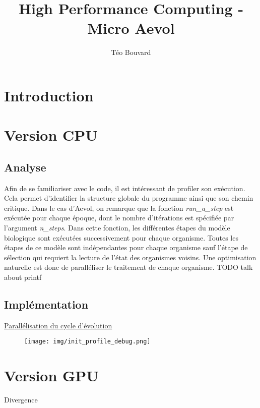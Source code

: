 \documentclass[a4paper, 10pt, twoside]{article}
\begin{document}
\title{High Performance Computing - Micro Aevol}
\author{T\'eo Bouvard}
\maketitle

\section{Introduction}
\section{Version CPU}
\subsection{Analyse}
Afin de se familiariser avec le code, il est intéressant de profiler son exécution. Cela permet d'identifier la structure globale du programme ainsi que son chemin critique. Dans le cas d'Aevol, on remarque que la fonction \textit{run\_a\_step} est exécutée pour chaque époque, dont le nombre d'itérations est spécifiée par l'argument \textit{n\_steps}.
Dans cette fonction, les différentes étapes du modèle biologique sont exécutées successivement pour chaque organisme. Toutes les étapes de ce modèle sont indépendantes pour chaque organisme sauf l'étape de sélection qui requiert la lecture de l'état des organismes voisins. Une optimisation naturelle est donc de paralléliser le traitement de chaque organisme\label{parallel/orga}.
TODO talk about printf
\subsection{Implémentation}
\hyperref[parallel/orga]{Parallélisation du cycle d'évolution}

\begin{figure}
	\texttt{[image: img/init\_profile\_debug.png]}
\end{figure}
\section{Version GPU}

Divergence \citep{nvidia/branching}





\end{document}
